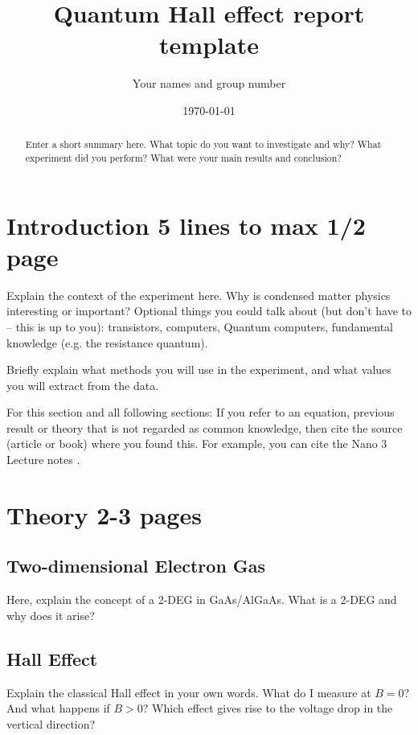 \documentclass[a4paper]{article}
\title{Quantum Hall effect report template}
\author{Your names and group number}
\date{\today}
\begin{document}
      \maketitle
      
      \begin{abstract}
      Enter a short summary here. What topic do you want to investigate and why? What experiment did you perform? What were your main results and conclusion?
      \end{abstract}
      
      \section{Introduction 5 lines to max 1/2 page}
      \label{sec:introduction}
      
      Explain the context of the experiment here. Why is condensed matter physics interesting or important?
      Optional things you could talk about (but don't have to -- this is up to you): transistors, computers, Quantum computers, fundamental knowledge (e.g. the resistance quantum).
      
      Briefly explain what methods you will use in the experiment, and what values you will extract from the data.
      
      For this section and all following sections: If you refer to an equation, previous result or theory that is not regarded as common knowledge, then cite the source (article or book) where you found this. For example, you can cite the Nano 3 Lecture notes \cite{nano3}.
      
      \section{Theory 2-3 pages}
      \label{sec:theory}
      
      \subsection{Two-dimensional Electron Gas}
      Here, explain the concept of a 2-DEG in GaAs/AlGaAs. What is a 2-DEG and why does it arise?
      
      \subsection{Hall Effect}
      Explain the classical Hall effect in your own words. What do I measure at $B=0$? And what happens if $B>0$? Which effect gives rise to the voltage drop in the vertical direction?
      
\end{document}
